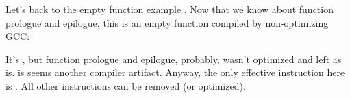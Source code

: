 
Let's back to the empty function example .
Now that we know about function prologue and epilogue,
this is an empty function  compiled by non-optimizing GCC:



It's , but function prologue and epilogue, probably, wasn't optimized and left as is.
 is seems another compiler artifact.
Anyway, the only effective instruction here is .
All other instructions can be removed (or optimized).


